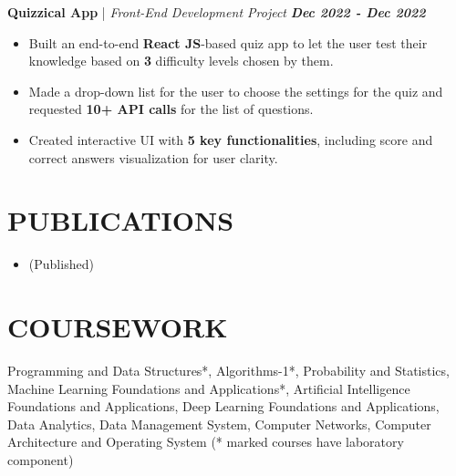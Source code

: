 \documentclass[a4paper,9pt]{extarticle}
\begin{document}
\vspace{-0.05cm}
\noindent
\textbf{Quizzical App} | \textit{Front-End Development Project} \hfill \textbf{\textit{Dec 2022 - Dec 2022}} %
\vspace{-0.15cm}
\begin{itemize}
    \item Built an end-to-end \textbf{React JS}-based quiz app to let the user test their knowledge based on \textbf{3} difficulty levels chosen by them.
    \item Made a drop-down list for the user to choose the settings for the quiz and requested \textbf{10+ API calls} for the list of questions.
    \item Created interactive UI with \textbf{5 key functionalities}, including score and correct answers visualization for user clarity.
\end{itemize}

\vspace{-0.4cm}
\section*{PUBLICATIONS}
\vspace{-0.3cm}
\noindent
\begin{itemize}
    \item {} (Published)
\end{itemize}

\vspace{-0.4cm}
\section*{COURSEWORK}
    \vspace{-0.2cm}
    Programming and Data Structures*, Algorithms-1*, Probability and Statistics, Machine Learning Foundations and Applications*, Artificial Intelligence Foundations and Applications, Deep Learning Foundations and Applications, Data Analytics, Data Management System, Computer Networks, Computer Architecture and Operating System (* marked courses have laboratory component)
\end{document}
